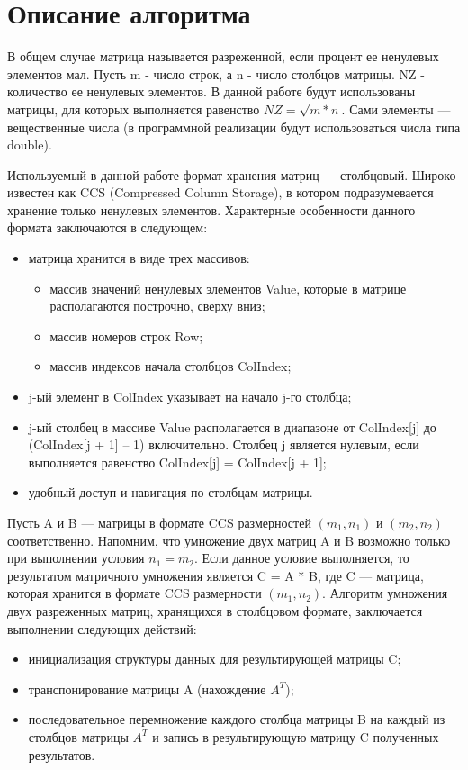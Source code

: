 \documentclass{report}
\begin{document}
\section*{Описание алгоритма}
\par В общем случае матрица называется разреженной, если  процент ее ненулевых элементов мал. Пусть m - число строк, а n - число столбцов матрицы. NZ - количество ее ненулевых элементов. В данной работе будут использованы матрицы, для которых выполняется равенство $NZ = \sqrt{m*n}$. Сами элементы — вещественные числа (в программной реализации будут использоваться числа типа double).
\par Используемый в данной работе формат хранения матриц — столбцовый. Широко известен как CCS (Compressed Column Storage), в котором подразумевается хранение только ненулевых элементов. Характерные особенности данного формата заключаются в следующем:
\begin{itemize}
	\item матрица хранится в виде трех массивов:
	\begin{itemize}
		\item массив значений ненулевых элементов Value, которые в матрице располагаются построчно, сверху вниз;
		\item массив номеров строк Row;
		\item массив индексов начала столбцов ColIndex;
	\end{itemize}
	\item j-ый элемент в ColIndex указывает на начало j-го столбца;
	\item j-ый столбец в массиве Value располагается в диапазоне от ColIndex[j] до (ColIndex[j + 1] – 1) включительно. Столбец j является нулевым, если выполняется равенство ColIndex[j] = ColIndex[j + 1];
	\item удобный доступ и навигация по столбцам матрицы.
\end{itemize}
\par Пусть A и B — матрицы в формате CCS размерностей $(m_{1}, n_{1})$ и $(m_{2}, n_{2})$ соответственно. Напомним, что умножение двух матриц A и B возможно только при выполнении условия $n_{1} = m_{2}$. Если данное условие выполняется, то результатом матричного умножения является C = A * B, где C — матрица, которая хранится в формате CCS размерности $(m_{1}, n_{2})$. Алгоритм умножения двух разреженных матриц, хранящихся в столбцовом формате, заключается выполнении следующих действий:
\begin{itemize}
	\item инициализация структуры данных для результирующей матрицы C;
	\item транспонирование матрицы A (нахождение $A^{T}$);
	\item последовательное перемножение каждого столбца матрицы B на каждый из столбцов матрицы $A^{T}$ и запись в результирующую матрицу C полученных результатов.
\end{itemize}
\newpage
\end{document}
